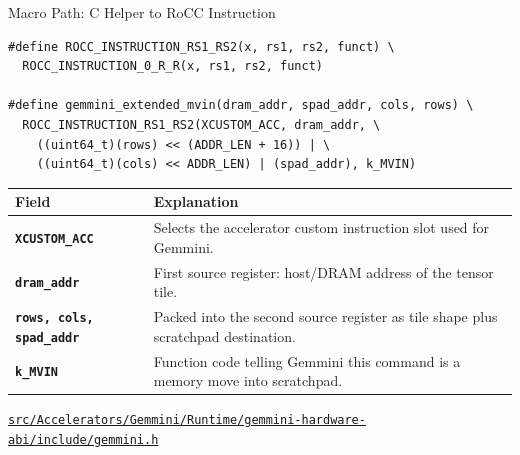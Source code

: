 \documentclass[aspectratio=169,10pt]{beamer}
\newcommand{\code}[1]{\texttt{\footnotesize #1}}
\newcommand{\repoRoot}{/home/lahcen/toolchains/onnx-mlir-xcompile/onnx-mlir}
\newcommand{\pathcode}[1]{\href{run:\repoRoot/#1}{\texttt{\scriptsize #1}}}
\newcommand{\edgeword}[1]{\textcolor{red!75!black}{\textbf{#1}}}
\begin{document}
\begin{frame}[fragile]{Macro Path: C Helper to RoCC Instruction}
  \begin{lstlisting}
#define ROCC_INSTRUCTION_RS1_RS2(x, rs1, rs2, funct) \
  ROCC_INSTRUCTION_0_R_R(x, rs1, rs2, funct)

#define gemmini_extended_mvin(dram_addr, spad_addr, cols, rows) \
  ROCC_INSTRUCTION_RS1_RS2(XCUSTOM_ACC, dram_addr, \
    ((uint64_t)(rows) << (ADDR_LEN + 16)) | \
    ((uint64_t)(cols) << ADDR_LEN) | (spad_addr), k_MVIN)
  \end{lstlisting}
  \scriptsize
  \begin{tabularx}{\textwidth}{@{}lX@{}}
    \toprule
    Field & Explanation \\
    \midrule
    \edgeword{\code{XCUSTOM\_ACC}} & Selects the accelerator custom instruction slot used for Gemmini. \\
    \edgeword{\code{dram\_addr}} & First source register: host/DRAM address of the tensor tile. \\
    \edgeword{\code{rows, cols, spad\_addr}} & Packed into the second source register as tile shape plus scratchpad destination. \\
    \edgeword{\code{k\_MVIN}} & Function code telling Gemmini this command is a memory move into scratchpad. \\
    \bottomrule
  \end{tabularx}

  \vspace{0.2em}
  \pathcode{src/Accelerators/Gemmini/Runtime/gemmini-hardware-abi/include/gemmini.h}
\end{frame}
\end{document}
